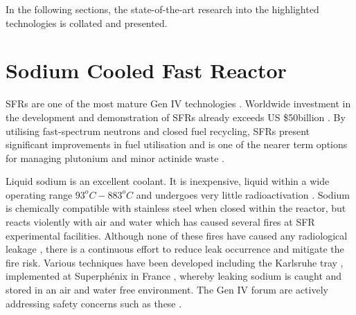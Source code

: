 \documentclass[journal]{IEEEtran}
\begin{document}
In the following sections, the state-of-the-art research into the highlighted technologies is collated and presented.


\section{Sodium Cooled Fast Reactor}
SFRs are one of the most mature Gen IV technologies \cite{Marques2010a}. 
Worldwide investment in the development and demonstration of SFRs already exceeds US \$50billion \cite{Int2012}. 
By utilising fast-spectrum neutrons and closed fuel recycling, SFRs present significant improvements in fuel utilisation and is one of the nearer term options for managing plutonium and minor actinide waste \cite{GenIVForum}.

Liquid sodium is an excellent coolant. 
It is inexpensive, liquid within a wide operating range $93^{o}C-883^{o}C$ and undergoes very little radioactivation \cite{Sakamoto2013194}. 
Sodium is chemically compatible with stainless steel when closed within the reactor, but reacts violently with air and water \cite{Int2012, Sakamoto2013194} which has caused several fires at SFR experimental facilities.
Although none of these fires have caused any radiological leakage \cite{Int2012}, there is a continuous effort to reduce leak occurrence and mitigate the fire risk. 
Various techniques have been developed including the Karlsruhe tray \cite{Huber1975155}, implemented at Superph\'{e}nix in France \cite{Int2012}, whereby leaking sodium is caught and stored in an air and water free environment. 
The Gen IV forum are actively addressing safety concerns such as these \cite{GenIVRoadmap}.
\end{document}
